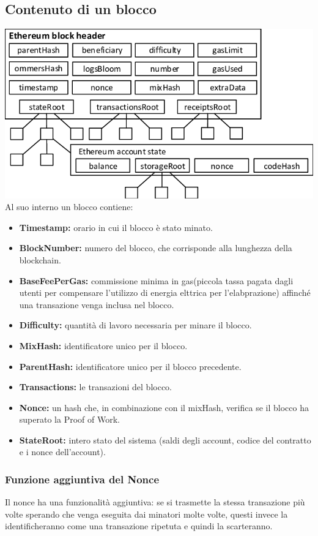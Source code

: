 \documentclass[a4paper,11pt]{report}
\begin{document}
\subsection{Contenuto di un blocco}
\includegraphics[scale=0.45]{img/block.png} 
\\Al suo interno un blocco contiene:
\begin{itemize} %
\item \textbf{Timestamp:} orario in cui il blocco è stato minato.
\item \textbf{BlockNumber:} numero del blocco, che corrisponde alla lunghezza della blockchain.
\item \textbf{BaseFeePerGas:} commissione minima in gas(piccola tassa pagata dagli utenti per compensare l'utilizzo di energia elttrica per l'elabprazione) affinché una transazione venga inclusa nel blocco.
\item \textbf{Difficulty:} quantità di lavoro necessaria per minare il blocco.
\item \textbf{MixHash:} identificatore unico per il blocco.
\item \textbf{ParentHash:} identificatore unico per il blocco precedente.
\item \textbf{Transactions:} le transazioni del blocco.
\item \textbf{Nonce:} un hash che, in combinazione con il mixHash, verifica se il blocco ha superato la Proof of Work.
\item \textbf{StateRoot:} intero stato del sistema (saldi degli account, codice del contratto e i nonce dell'account).
\end{itemize}

\subsubsection{Funzione aggiuntiva del Nonce}
Il nonce ha una funzionalità aggiuntiva: se si trasmette la stessa transazione più volte sperando che venga eseguita dai minatori molte volte, questi invece la identificheranno come una transazione ripetuta e quindi la scarteranno.
\end{document}
